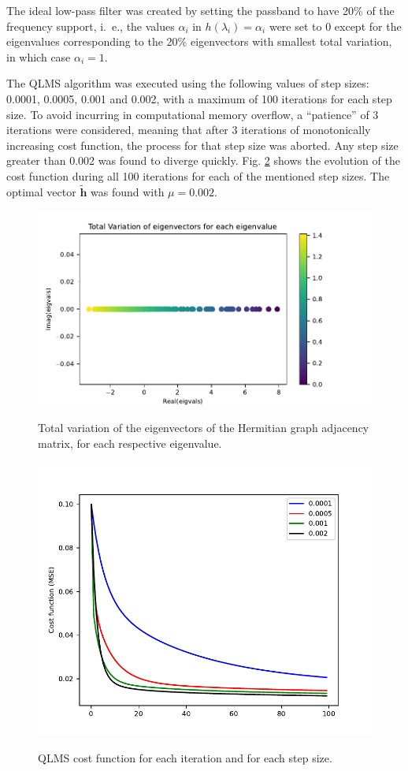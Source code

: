 The ideal low-pass filter was created by setting the passband to have 20\% of the frequency support, i.~e., the values $\alpha_i$ in $h(\lambda_i) = \alpha_i$ were set to 0 except for the eigenvalues corresponding to the 20\% eigenvectors with smallest total variation, in which case $\alpha_i = 1$.

The QLMS algorithm was executed using the following values of step sizes: 0.0001, 0.0005, 0.001 and 0.002, with a maximum of 100 iterations for each step size. To avoid incurring in computational memory overflow, a ``patience'' of 3 iterations were considered, meaning that after 3 iterations of monotonically increasing cost function, the process for that step size was aborted. Any step size greater than 0.002 was found to diverge quickly. Fig. \ref{fig:uk_qlms_iterations} shows the evolution of the cost function during all 100 iterations for each of the mentioned step sizes. The optimal vector $\mathbf{\widetilde{h}}$ was found with $\mu = 0.002$.

\begin{figure}
    \centering
    \caption{Total variation of the eigenvectors of the Hermitian graph adjacency matrix, for each respective eigenvalue.}
    \includegraphics[width=0.9\linewidth]{Figures/uk_example/uk_total_variation_hermitian.pdf}
    \floatsource
    \label{fig:uk_total_variation_hermitian}
\end{figure}

\begin{figure}
    \centering
    \caption{QLMS cost function for each iteration and for each step size.}
    \includegraphics[width=0.8\linewidth]{Figures/uk_example/uk_qlms_iterations.pdf}
    \floatsource
    \label{fig:uk_qlms_iterations}
\end{figure}

